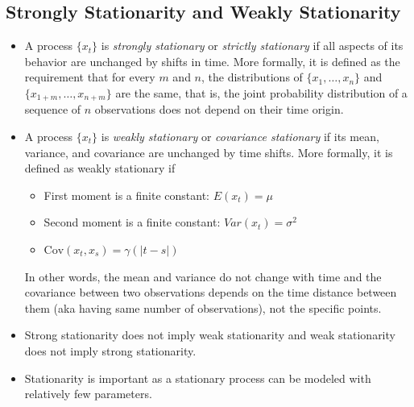 \documentclass[11pt]{article}
\begin{document}
\subsection{Strongly Stationarity and Weakly Stationarity}
\begin{itemize}
    \item A process $\{x_t\}$ is \textit{strongly stationary} or \textit{strictly stationary}
    if all aspects of its behavior are unchanged by shifts in time. More formally, it is
    defined as the requirement that for every $m$ and $n$, the distributions of $\{x_1, \ldots,
    x_n\}$ and $\{x_{1+m}, \ldots, x_{n+m}\}$ are the same, that is, the joint probability 
    distribution of a sequence of $n$ observations does not depend on their time origin.
   \item A process $\{x_t\}$ is \textit{weakly stationary} or \textit{covariance stationary} if 
   its mean, variance, and covariance are unchanged by time shifts. More formally, it is 
   defined as weakly stationary if 
   \begin{itemize}
    \item First moment is a finite constant: $E(x_t) = \mu$
    \item Second moment is a finite constant: $Var(x_t) = \sigma^2$
    \item $\text{Cov}(x_t, x_s) = \gamma(|t-s|)$
   \end{itemize}
   In other words, the mean and variance do not change with time and the covariance between 
   two observations depends on the time distance between them (aka having same number of 
   observations), not the specific points. 
   \item Strong stationarity does not imply weak stationarity and weak stationarity does not 
   imply strong stationarity.    
   \item Stationarity is important as a stationary process can be modeled with relatively few 
   parameters.
\end{itemize}
\end{document}
